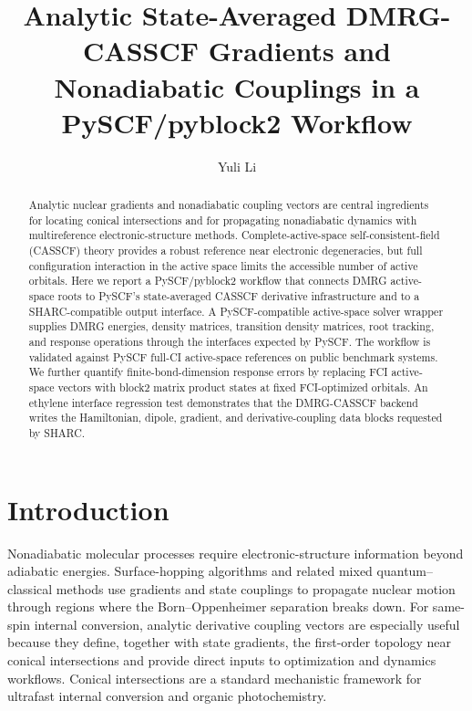 \documentclass[journal=jctcce,manuscript=article]{achemso}
\title{Analytic State-Averaged DMRG-CASSCF Gradients and Nonadiabatic Couplings in a PySCF/pyblock2 Workflow}
\author{Yuli Li}
\affiliation[Harvard University]
{Department of Chemistry and Chemical Biology, Harvard University, Cambridge,
Massachusetts 02138, United States}
\begin{document}
\begin{abstract}
Analytic nuclear gradients and nonadiabatic coupling vectors are central
ingredients for locating conical intersections and for propagating
nonadiabatic dynamics with multireference electronic-structure methods.
Complete-active-space self-consistent-field (CASSCF) theory provides a
robust reference near electronic degeneracies, but full configuration
interaction in the active space limits the accessible number of active
orbitals.  Here we report a PySCF/pyblock2 workflow that connects DMRG
active-space roots to PySCF's state-averaged CASSCF derivative
infrastructure and to a SHARC-compatible output interface.  A
PySCF-compatible active-space solver wrapper supplies DMRG energies, density
matrices, transition density matrices, root tracking, and response operations
through the interfaces expected by PySCF.  The workflow is validated against
PySCF full-CI active-space references on public benchmark systems.  We
further quantify finite-bond-dimension response errors by replacing FCI
active-space vectors with block2 matrix product states at fixed
FCI-optimized orbitals.  An ethylene interface regression test demonstrates
that the DMRG-CASSCF backend writes the Hamiltonian, dipole, gradient, and
derivative-coupling data blocks requested by SHARC.
\end{abstract}

\section{Introduction}

Nonadiabatic molecular processes require electronic-structure information
beyond adiabatic energies.  Surface-hopping algorithms and related
mixed quantum--classical methods use gradients and state couplings to
propagate nuclear motion through regions where the Born--Oppenheimer
separation breaks down.\cite{Tully1990,Richter2011SHARC,Mai2018SHARC}
For same-spin internal conversion, analytic derivative coupling vectors are
especially useful because they define, together with state gradients, the
first-order topology near conical intersections and provide direct inputs to
optimization and dynamics workflows.\cite{FdezGalvan2016}
Conical intersections are a standard mechanistic framework for ultrafast
internal conversion and organic photochemistry.\cite{Yarkony1996,Bernardi1996,Bearpark1994}
\end{document}
